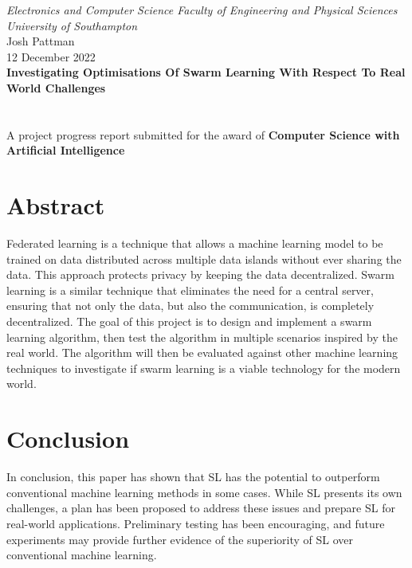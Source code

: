 \documentclass[12pt,a4paper,titlepage]{report}
\begin{document}
	\begin{titlepage}
		\centering\Large\emph{Electronics and Computer Science Faculty of Engineering and Physical Sciences University of Southampton}
		\\[2cm]
		\centering\Large{Josh Pattman} \\
		\centering\Large{12 December 2022} \\
		\centering\huge\textbf{Investigating Optimisations Of Swarm Learning With Respect To Real World Challenges}
		\\[2cm]
		 \\[1cm]
		\\[2cm]
		\centering\Large{A project progress report submitted for the award of \textbf{Computer Science with Artificial Intelligence}}
	\end{titlepage}

	


	\chapter*{Abstract}	
	Federated learning is a technique that allows a machine learning model to be trained on data distributed across multiple data islands without ever sharing the data. This approach protects privacy by keeping the data decentralized. Swarm learning is a similar technique that eliminates the need for a central server, ensuring that not only the data, but also the communication, is completely decentralized. The goal of this project is to design and implement a swarm learning algorithm, then test the algorithm in multiple scenarios inspired by the real world. The algorithm will then be evaluated against other machine learning techniques to investigate if swarm learning is a viable technology for the modern world.

	\tableofcontents
	
	
	
	
	\chapter{Conclusion}
	In conclusion, this paper has shown that SL has the potential to outperform conventional machine learning methods in some cases. While SL presents its own challenges, a plan has been proposed to address these issues and prepare SL for real-world applications. Preliminary testing has been encouraging, and future experiments may provide further evidence of the superiority of SL over conventional machine learning.
	
	
	{}
\end{document}
